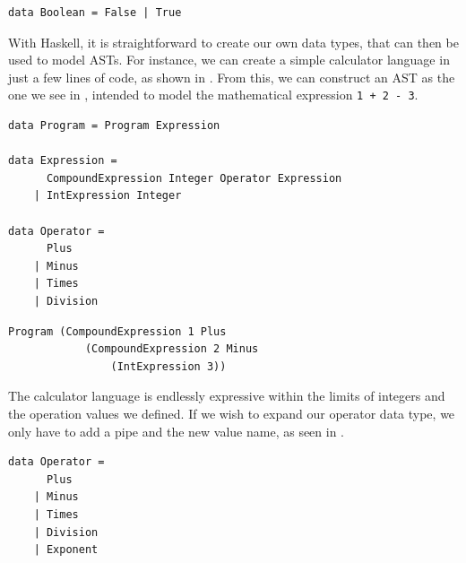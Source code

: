 \begin{lstlisting}[caption={Recreating the Boolean type with Haskell.}, captionpos=b, label={Recreating the Boolean type with Haskell.}]
data Boolean = False | True
\end{lstlisting}

With Haskell, it is straightforward to create our own data types, that can then be used to model ASTs. For instance, we can create a simple calculator language in just a few lines of code, as shown in . From this, we can construct an AST as the one we see in , intended to model the mathematical expression \texttt{1 + 2 - 3}. \\

\begin{lstlisting}[caption={Data types for a calculator language in Haskell.}, captionpos=b, label={Data types for a calculator language in Haskell.}]
data Program = Program Expression

data Expression =
      CompoundExpression Integer Operator Expression
    | IntExpression Integer

data Operator =
      Plus
    | Minus
    | Times
    | Division
\end{lstlisting}

\begin{lstlisting}[caption={An AST constructed with data types presented in \Cref{Data types for a calculator language in Haskell.}}, captionpos=b, label={An AST constructed with data types presented in}]
Program (CompoundExpression 1 Plus
            (CompoundExpression 2 Minus
                (IntExpression 3))
\end{lstlisting}

The calculator language is endlessly expressive within the limits of integers and the operation values we defined. If we wish to expand our operator data type, we only have to add a pipe and the new value name, as seen in . \\

\begin{lstlisting}[caption={An extended version of the Operator data type presented in \Cref{Data types for a calculator language in Haskell.}}, captionpos=b, label={An extended version of the Operator data type presented in}]
data Operator =
      Plus
    | Minus
    | Times
    | Division
    | Exponent
\end{lstlisting}

